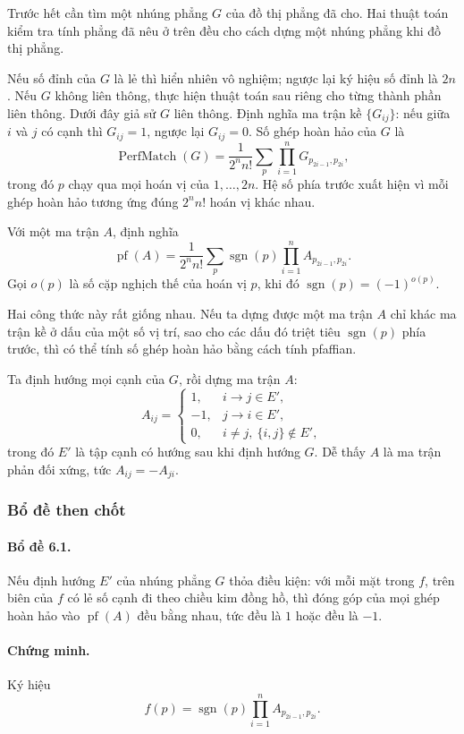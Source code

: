 \documentclass[11pt]{article}
\begin{document}
Trước hết cần tìm một nhúng phẳng $G$ của đồ thị phẳng đã cho. Hai thuật toán
kiểm tra tính phẳng đã nêu ở trên đều cho cách dựng một nhúng phẳng khi đồ thị
phẳng.

Nếu số đỉnh của $G$ là lẻ thì hiển nhiên vô nghiệm; ngược lại ký hiệu số đỉnh
là $2n$. Nếu $G$ không liên thông, thực hiện thuật toán sau riêng cho từng thành
phần liên thông. Dưới đây giả sử $G$ liên thông. Định nghĩa ma trận kề
$\{G_{ij}\}$: nếu giữa $i$ và $j$ có cạnh thì $G_{ij}=1$, ngược lại
$G_{ij}=0$. Số ghép hoàn hảo của $G$ là
\[
  \operatorname{PerfMatch}(G)
  =\frac{1}{2^n n!}\sum_p\prod_{i=1}^n G_{p_{2i-1},p_{2i}},
\]
trong đó $p$ chạy qua mọi hoán vị của $1,\ldots,2n$. Hệ số phía trước xuất hiện
vì mỗi ghép hoàn hảo tương ứng đúng $2^n n!$ hoán vị khác nhau.

Với một ma trận $A$, định nghĩa
\[
  \operatorname{pf}(A)
  =
  \frac{1}{2^n n!}\sum_p \operatorname{sgn}(p)
  \prod_{i=1}^n A_{p_{2i-1},p_{2i}}.
\]
Gọi $o(p)$ là số cặp nghịch thế của hoán vị $p$, khi đó
$\operatorname{sgn}(p)=(-1)^{o(p)}$.

Hai công thức này rất giống nhau. Nếu ta dựng được một ma trận $A$ chỉ khác ma
trận kề ở dấu của một số vị trí, sao cho các dấu đó triệt tiêu
$\operatorname{sgn}(p)$ phía trước, thì có thể tính số ghép hoàn hảo bằng cách
tính pfaffian.

Ta định hướng mọi cạnh của $G$, rồi dựng ma trận $A$:
\[
A_{ij}=
\begin{cases}
1, & i\to j\in E',\\
-1, & j\to i\in E',\\
0, & i\ne j,\ \{i,j\}\notin E',
\end{cases}
\]
trong đó $E'$ là tập cạnh có hướng sau khi định hướng $G$. Dễ thấy $A$ là ma
trận phản đối xứng, tức $A_{ij}=-A_{ji}$.

\subsubsection{Bổ đề then chốt}

\paragraph{Bổ đề 6.1.}
Nếu định hướng $E'$ của nhúng phẳng $G$ thỏa điều kiện: với mỗi mặt trong $f$,
trên biên của $f$ có lẻ số cạnh đi theo chiều kim đồng hồ, thì đóng góp của mọi
ghép hoàn hảo vào $\operatorname{pf}(A)$ đều bằng nhau, tức đều là $1$ hoặc đều
là $-1$.

\paragraph{Chứng minh.}
Ký hiệu
\[
  f(p)=\operatorname{sgn}(p)\prod_{i=1}^n A_{p_{2i-1},p_{2i}}.
\]
\end{document}
